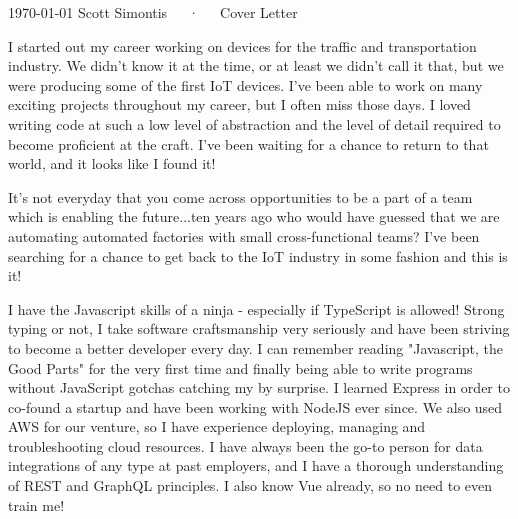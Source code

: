 \documentclass[11pt, letterpaper]{awesome-cv}
\begin{document}
\makecvheader[R]

\makecvfooter
  {\today}
  {Scott Simontis~~~·~~~Cover Letter}
  {}

\makelettertitle

\begin{cvletter}

I started out my career working on devices for the traffic and transportation industry. We didn't know it at the time, or at least we didn't call it that, but we were producing some of the first IoT devices. I've been able to work on many exciting projects throughout my career, but I often miss those days. I loved writing code at such a low level of abstraction and the level of detail required to become proficient at the craft. I've been waiting for a chance to return to that world, and it looks like I found it!

It's not everyday that you come across opportunities to be a part of a team which is enabling the future...ten years ago who would have guessed that we are automating automated factories with small cross-functional teams? I've been searching for a chance to get back to the IoT industry in some fashion and this is it!

I have the Javascript skills of a ninja - especially if TypeScript is allowed! Strong typing or not, I take software craftsmanship very seriously and have been striving to become a better developer every day. I can remember reading "Javascript, the Good Parts" for the very first time and finally being able to write programs without JavaScript gotchas catching my by surprise. I learned Express in order to co-found a startup and have been working with NodeJS ever since. We also used AWS for our venture, so I have experience deploying, managing and troubleshooting cloud resources. I have always been the go-to person for data integrations of any type at past employers, and I have a thorough understanding of REST and GraphQL principles. I also know Vue already, so no need to even train me!

\end{cvletter}


\makeletterclosing
\end{document}
